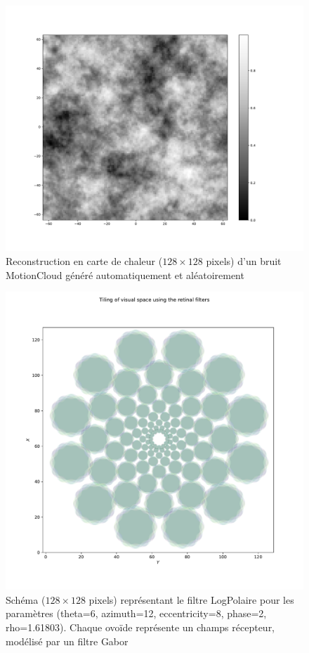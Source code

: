 \begin{figure}[th]
\centering
\includegraphics[scale=0.4]{Figures/motioncloud_noise}
\decoRule
\caption[Figure]{Reconstruction en carte de chaleur ($128\times 128$ pixels) d'un bruit MotionCloud généré automatiquement et aléatoirement \autocite{Leon2012}}
\label{fig:motioncloud_noise}
\end{figure}

\begin{figure}[th]
\centering
\includegraphics[scale=0.4]{Figures/retina_filter}
\decoRule
\caption[Figure]{Schéma ($128\times 128$ pixels) représentant le filtre LogPolaire pour les paramètres (theta=6, azimuth=12, eccentricity=8, phase=2, rho=1.61803). Chaque ovoïde représente un champs récepteur, modélisé par un filtre Gabor \autocite{Freeman2011}}
\label{fig:logpol_filter}
\end{figure}


